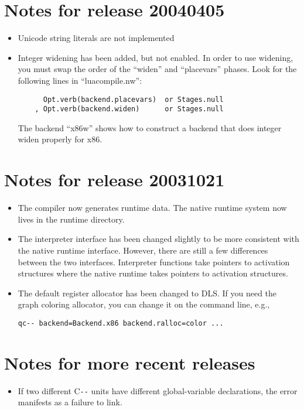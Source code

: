 \documentclass{article}
\def\PAL{\mbox{C{\texttt{-{}-}}}}
\begin{document}
\section{Notes for release 20040405}
\begin{itemize}
\item
Unicode string literals are not implemented

\item Integer widening has been added, but not enabled.
In order to use widening, you must swap the order of the
``widen'' and ``placevars'' phases.  Look for the following lines in
``luacompile.nw'':
\begin{verbatim}
      Opt.verb(backend.placevars)  or Stages.null
    , Opt.verb(backend.widen)      or Stages.null
\end{verbatim}
The backend ``x86w'' shows how to construct a backend that does
integer widen properly for x86.

\end{itemize}



\section{Notes for release 20031021}
\begin{itemize}
\item
The compiler now generates runtime data. The native runtime system now
lives in the runtime directory.
\item
The interpreter interface has been changed slightly to be more
consistent with the native runtime interface. However, there are still
a few differences between the two interfaces. Interpreter functions
take pointers to activation structures where the native runtime takes
pointers to activation structures.
\item
The default register allocator has been changed to DLS. If you need
the graph coloring allocator, you can change it on the command line,
e.g.,
\begin{verbatim}
qc-- backend=Backend.x86 backend.ralloc=color ...
\end{verbatim}


\end{itemize}

\section{Notes for more recent releases}

\begin{itemize}
\item
If two different {\PAL} units have different global-variable
declarations, the error manifests as a failure to link.
\end{itemize}
\end{document}
